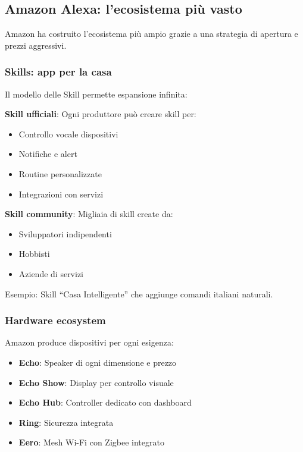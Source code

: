 \subsection{Amazon Alexa: l'ecosistema più vasto}

Amazon ha costruito l'ecosistema più ampio grazie a una strategia di apertura e prezzi aggressivi.

\subsubsection{Skills: app per la casa}

Il modello delle Skill permette espansione infinita:

\textbf{Skill ufficiali}: Ogni produttore può creare skill per:
\begin{itemize}
    \item Controllo vocale dispositivi
    \item Notifiche e alert
    \item Routine personalizzate
    \item Integrazioni con servizi
\end{itemize}

\textbf{Skill community}: Migliaia di skill create da:
\begin{itemize}
    \item Sviluppatori indipendenti
    \item Hobbisti
    \item Aziende di servizi
\end{itemize}

Esempio: Skill ``Casa Intelligente'' che aggiunge comandi italiani naturali.

\subsubsection{Hardware ecosystem}

Amazon produce dispositivi per ogni esigenza:

\begin{itemize}
    \item \textbf{Echo}: Speaker di ogni dimensione e prezzo
    \item \textbf{Echo Show}: Display per controllo visuale
    \item \textbf{Echo Hub}: Controller dedicato con dashboard
    \item \textbf{Ring}: Sicurezza integrata
    \item \textbf{Eero}: Mesh Wi-Fi con Zigbee integrato
\end{itemize}

